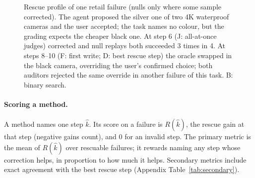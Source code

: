 \documentclass[11pt]{article}
\newcommand{\Rhat}{R(\hat{k})}
\begin{document}
\begin{figure}[t]
\centering
\caption{Rescue profile of one retail failure (nulls only where some sample corrected). The agent proposed the silver one of two 4K waterproof cameras and the user accepted; the task names no colour, but the grading expects the cheaper black one. At step 6 (J: all-at-once judges) corrected and null replays both succeeded 3 times in 4. At steps 8--10 (F: first write; D: best rescue step) the oracle swapped in the black camera, overriding the user's confirmed choice; both auditors rejected the same override in another failure of this task. B: binary search.}
\label{fig:profile}
\end{figure}

\paragraph{Scoring a method.} A method names one step $\hat{k}$. Its score on a failure is $\Rhat$, the rescue gain at that step (negative gains count), and 0 for an invalid step. The primary metric is the mean of $\Rhat$ over rescuable failures; it rewards naming any step whose correction helps, in proportion to how much it helps. Secondary metrics include exact agreement with the best rescue step (Appendix Table~\ref{tab:secondary}).
\end{document}
